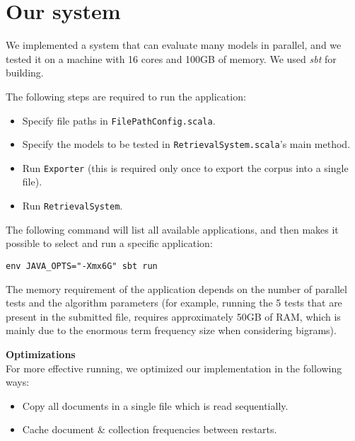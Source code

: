 \documentclass[12pt]{article}
\begin{document}
\section{Our system}

We implemented a system that can evaluate many models in parallel, and we tested it on a machine with 16 cores and 100GB of memory. 
We used \textit{sbt} for building.

The following steps are required to run the application:
\begin{itemize}
	\item Specify file paths in \texttt{FilePathConfig.scala}.
	\item Specify the models to be tested in \texttt{RetrievalSystem.scala}'s main method.
	\item Run \texttt{Exporter} (this is required only once to export the corpus into a single file).
	\item Run \texttt{RetrievalSystem}.

\end{itemize}
The following command will list all available applications, and then makes it possible to select and run a specific application:\\

{\centering
\texttt{env JAVA\_OPTS="-Xmx6G" sbt run} \par
}
\vspace{0.5cm}
The memory requirement of the application depends on the number of parallel tests and the algorithm parameters (for example, running the 5 tests that are present in the submitted file, requires approximately 50GB of RAM, which is mainly due to the enormous term frequency size when considering bigrams).



\vspace{0.5cm}
\textbf{Optimizations} \\
For more effective running, we optimized our implementation in the following ways:
\begin{itemize}
	\item Copy all documents in a single file which is read sequentially.
	\item Cache document \& collection frequencies between restarts.
\end{itemize}
\end{document}
